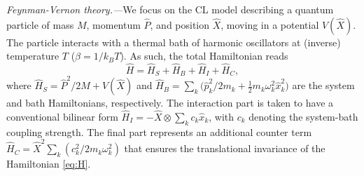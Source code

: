\documentclass[prl,twocolumn,superscriptaddress,amsmath,amssymb]{revtex4-2}
\def\be{\begin{equation}}
\def\ee{\end{equation}}
\begin{document}
{\it Feynman-Vernon theory.---}We focus on the CL model \cite{CaldeiraLeggettA} describing a quantum particle of mass $M$, momentum $\hat{P}$, and position $\hat{X}$, moving in a potential $V(\hat{X})$. The particle interacts with a thermal bath of  harmonic oscillators at (inverse) temperature $T$ ($\beta = 1/k_BT$). As such, the total Hamiltonian reads 
\be\label{eq:H}
\hat{H} = \hat{H}_S + \hat{H}_B + \hat{H}_I + \hat{H}_C,
\ee
where $\hat{H}_S=\hat{P}^2/2M+V(\hat{X})$ and $\hat{H}_B =\sum_k\big(\hat{p}_k^2/2m_k + \frac{1}{2}m_k\omega^2_k\hat{x}_k^2\big)$ are the system and bath Hamiltonians, respectively. The interaction part is taken to have a conventional bilinear form $\hat{H}_I=-\hat{X}
\otimes\sum_kc_k\hat{x}_k$, with $c_k$ denoting the system-bath coupling strength. The final part represents an additional counter term $\hat{H}_C=\hat{X}^2\sum_k(c^2_k/2m_k\omega^2_k)$ that ensures the translational invariance of the Hamiltonian \eqref{eq:H}. 
\end{document}
